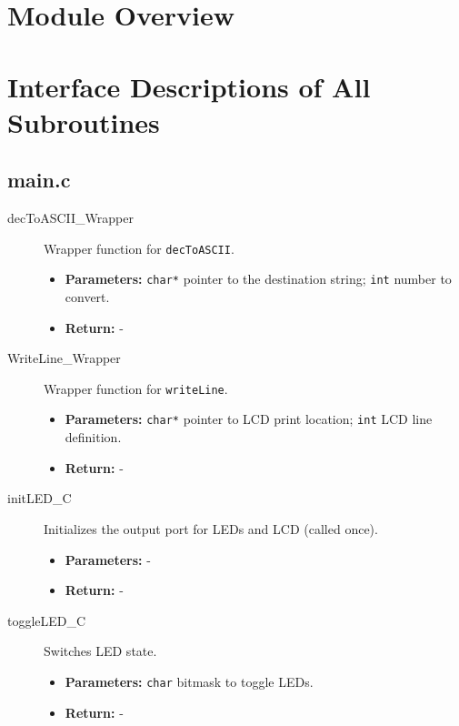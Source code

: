 \documentclass[a4paper,12pt]{article}
\begin{document}
\section{Module Overview}
\newpage
\section{Interface Descriptions of All Subroutines}

\subsection{main.c}

\begin{description}
    \item[decToASCII\_Wrapper] Wrapper function for \texttt{decToASCII}.
    \begin{itemize}
        \item \textbf{Parameters:} \texttt{char*} pointer to the destination string; \texttt{int} number to convert.
        \item \textbf{Return:} -
    \end{itemize}
    
    \item[WriteLine\_Wrapper] Wrapper function for \texttt{writeLine}.
    \begin{itemize}
        \item \textbf{Parameters:} \texttt{char*} pointer to LCD print location; \texttt{int} LCD line definition.
        \item \textbf{Return:} -
    \end{itemize}
    
    \item[initLED\_C] Initializes the output port for LEDs and LCD (called once).
    \begin{itemize}
        \item \textbf{Parameters:} -
        \item \textbf{Return:} -
    \end{itemize}
    
    \item[toggleLED\_C] Switches LED state.
    \begin{itemize}
        \item \textbf{Parameters:} \texttt{char} bitmask to toggle LEDs.
        \item \textbf{Return:} -
    \end{itemize}
    

\end{description}
\end{document}
